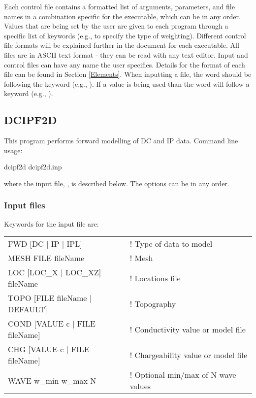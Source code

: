 Each control file contains a formatted list of arguments, parameters, and file names in a combination specific for the executable, which can be in any order. Values that are being set by the user are given to each program through a specific list of keywords (e.g.,  to specify the type of weighting).  Different control file formats will be explained further in the document for each executable. All files are in ASCII text format - they can be read with any text editor. Input and control files can have any name the user specifies. Details for the format of each file can be found in Section \ref{Elements}. When inputting a file, the word  should be following the keyword (e.g., ). If a value is being used than the word  will follow a keyword (e.g., ).

\subsection{DCIPF2D}
This program performs forward modelling of DC and IP data. Command line usage:

\begin{fileExample}
dcipf2d dcipf2d.inp
\end{fileExample}
where the input file, , is described below. The options can be in any order. 

\subsubsection{Input files}
Keywords for the input file  are:
%
\begin{fileExample}
\begin{tabular}{|ll|}
\hline
FWD [DC | IP | IPL] & ! Type of data to model \\
MESH FILE fileName & ! Mesh \\
LOC [LOC\_X | LOC\_XZ] fileName &  ! Locations file\\
TOPO [FILE fileName | DEFAULT] & ! Topography \\
COND [VALUE c | FILE fileName] & ! Conductivity value or model file \\
CHG [VALUE c | FILE fileName] & ! Chargeability value or model file \\
WAVE w\_min w\_max N & ! Optional min/max of N wave values \\
\hline
\end{tabular}
\end{fileExample}

